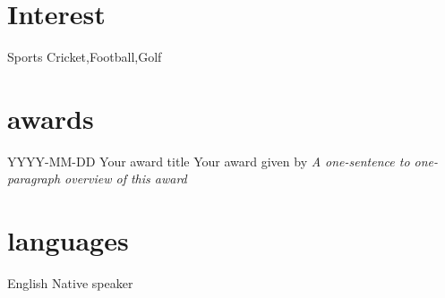 \documentclass[]{friggeri-cv}
\begin{document}
\section{Interest}

\begin{entrylist}
  
  \entry
    { Sports }
    { Cricket,Football,Golf }
    {}
    {}

\end{entrylist}

\section{awards}

\begin{entrylist}
  
  \entry
    { YYYY-MM-DD }
    { Your award title }
    { Your award given by }
    {\emph{ A one-sentence to one-paragraph overview of this award }}

\end{entrylist}


\section{languages}

\begin{entrylist}
  
  \entry
    {}
    { English }
    { Native speaker }
    {}

\end{entrylist}

%

%
\end{document}
